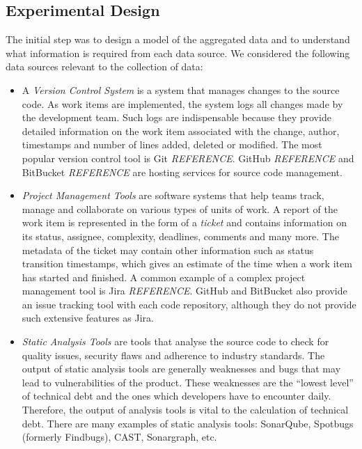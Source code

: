 \documentclass{mpaper}
\begin{document}
\subsection{Experimental Design}
\label{experimental-design}

The initial step was to design a model of the aggregated data and to understand
what information is required from each data source. We considered the following
data sources relevant to the collection of data:

\begin{itemize}
  \item A \emph{Version Control System} is a system that manages changes to the
  source code. As work items are implemented, the system logs all changes made
  by the development team. Such logs are indispensable because they provide
  detailed information on the work item associated with the change, author,
  timestamps and number of lines added, deleted or modified. The most popular
  version control tool is Git \emph{REFERENCE}. GitHub \emph{REFERENCE} and
  BitBucket \emph{REFERENCE} are hosting services for source code management.

  \item \emph{Project Management Tools} are software systems that help teams
  track, manage and collaborate on various types of units of work. A report of
  the work item is represented in the form of a \emph{ticket} and contains
  information on its status, assignee, complexity, deadlines, comments and many
  more. The metadata of the ticket may contain other information such as status
  transition timestamps, which gives an estimate of the time when a work item
  has started and finished. A common example of a complex project management
  tool is Jira \emph{REFERENCE}. GitHub and BitBucket also provide an issue
  tracking tool with each code repository, although they do not provide such
  extensive features as Jira.
  
  \item \emph{Static Analysis Tools} are tools that analyse the source code to
  check for quality issues, security flaws and adherence to industry standards.
  The output of static analysis tools are generally weaknesses and bugs that may
  lead to vulnerabilities of the product. These weaknesses are the ``lowest
  level'' of technical debt and the ones which developers have to encounter
  daily. Therefore, the output of analysis tools is vital to the calculation of
  technical debt. There are many examples of static analysis tools: SonarQube,
  Spotbugs (formerly Findbugs), CAST, Sonargraph, etc.

\end{itemize}
\end{document}
